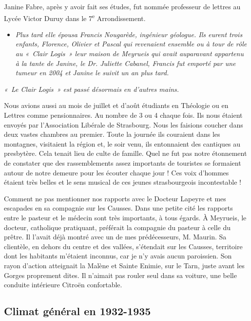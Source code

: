 Janine Fabre, après y avoir fait ses études, fut nommée professeur de lettres au Lycée
Victor Duruy dans le 7\textsuperscript{e} Arrondissement.

\begin{itemize}
\item \emph{Plus tard elle épousa Francis Nougarède, ingénieur géologue. Ils eurent trois enfants,
Florence, Olivier et Pascal qui revenaient ensemble ou à tour de rôle au «~Clair Logis~»
leur maison de Meyrueis qui avait auparavant appartenu à la tante de Janine, le Dr. Juliette
Cabanel, Francis fut emporté par une tumeur en 2004 et Janine le suivit un an plus tard.}
\end{itemize}

\emph{«~Le Clair Logis~» est passé désormais en d’autres mains.}

Nous avions aussi au mois de juillet et d’août étudiants en Théologie ou en Lettres
comme pensionnaires. Au nombre de 3 ou 4 chaque fois. Ils nous étaient envoyés par
l’Association Libérale de Strasbourg. Nous les faisions coucher dans deux vastes
chambres au premier. Toute la journée ils couraient dans les montagnes, visitaient la
région et, le soir venu, ils entonnaient des cantiques au presbytère. Cela tenait lieu de
culte de famille. Quel ne fut pas notre étonnement de constater que des
rassemblements assez importants de touristes se formaient autour de notre demeure
pour les écouter chaque jour ! Ces voix d’hommes étaient très belles et le sens musical
de ces jeunes strasbourgeois incontestable !

Comment ne pas mentionner nos rapports avec le Docteur Lapeyre et mes escapades
en sa compagnie sur les Causses. Dans une petite cité les rapports entre le pasteur et
le médecin sont très importants, à tous égards. À Meyrueis, le docteur, catholique
pratiquant, préférait la compagnie du pasteur à celle du prêtre. Il l’avait déjà montré
avec un de mes prédécesseurs, M. Maurin.
Sa clientèle, en dehors du centre et des vallées, s’étendait sur les Causses, territoire
dont les habitants m’étaient inconnus, car je n’y avais aucun paroissien. Son rayon
d’action atteignait la Malène et Sainte Enimie, sur le Tarn, juste avant les Gorges
proprement dites. Il n’aimait pas rouler seul dans sa voiture, une belle conduite
intérieure Citroën confortable.


\subsection{Climat général en 1932-1935}

